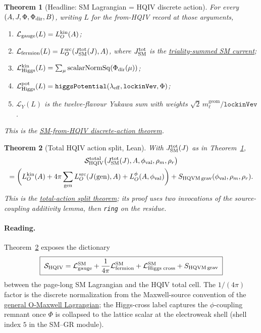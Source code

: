 \documentclass[11pt]{amsart}
\newtheorem{theorem}{Theorem}[section]
\begin{document}
\begin{theorem}[Headline: SM Lagrangian = HQIV discrete action]
\label{thm:headline}
For every $(A, J, \Phi, \Phi_{\rm dir}, B)$, writing $L$ for the from-HQIV
record at those arguments,
\begin{enumerate}[leftmargin=2em]
\item $\mathcal{L}_{\rm gauge}(L) = L_O^{\rm kin}(A)$;
\item $\mathcal{L}_{\rm fermion}(L) = L_O^{\rm src}\!\left(J_{\rm SM}^{\rm tot}(J),A\right)$,
where $J_{\rm SM}^{\rm tot}$ is the \hyperref[lean:J-SM-total]{triality-summed SM current};
\item $\mathcal{L}_{\rm Higgs}^{\rm kin}(L)
= \sum_\mu \mathrm{scalarNormSq}(\Phi_{\rm dir}(\mu))$;
\item $\mathcal{L}_{\rm Higgs}^{\rm pot}(L)
= \texttt{higgsPotential}(\lambda_{\rm eff},\texttt{lockinVev},\Phi)$;
\item $\mathcal{L}_Y(L)$ is the twelve-flavour Yukawa sum with weights
$\sqrt{2}\,m_\ell^{\mathrm{geom}}/\texttt{lockinVev}$.
\end{enumerate}
This is the \hyperref[lean:headline]{SM-from-HQIV discrete-action theorem}.
\end{theorem}

\begin{theorem}[Total HQIV action split, Lean]
\label{thm:total-split-lean}
With $J_{\rm SM}^{\rm tot}(J)$ as in Theorem~\ref{thm:headline},
\begin{multline*}
\mathcal{S}_{\mathrm{HQIV}}^{\mathrm{total}}\bigl(J_{\rm SM}^{\rm tot}(J),A,\phi_{\rm val},\rho_m,\rho_r\bigr)
\\
= \biggl(L_O^{\rm kin}(A)
+ 4\pi\sum_{\rm gen} L_O^{\rm src}(J({\rm gen}),A)
+ L_O^\phi(A,\phi_{\rm val})\biggr) + S_{\rm HQVM\,grav}(\phi_{\rm val},\rho_m,\rho_r).
\end{multline*}
This is the \hyperref[lean:total-split]{total-action split theorem}; its
proof uses two invocations of the source-coupling additivity lemma, then
\texttt{ring} on the residue.
\end{theorem}

\paragraph{Reading.}
Theorem~\ref{thm:total-split-lean} exposes the dictionary
\[
\boxed{\;
\mathcal{S}_{\rm HQIV}
= \mathcal{L}_{\rm gauge}^{\rm SM}
+ \frac{1}{4\pi}\mathcal{L}_{\rm fermion}^{\rm SM}
+ \mathcal{L}_{\rm Higgs\;cross}^{\rm SM}
+ S_{\rm HQVM\,grav}
\;}
\]
between the page-long SM Lagrangian and the HQIV total cell. The
$1/(4\pi)$ factor is the discrete normalization from the Maxwell-source
convention of the \hyperref[lean:LO-maxwell]{general O-Maxwell Lagrangian};
the Higgs-cross label captures the $\phi$-coupling remnant once $\Phi$ is
collapsed to the lattice scalar at the electroweak shell (shell index $5$ in
the SM--GR module).
\end{document}
